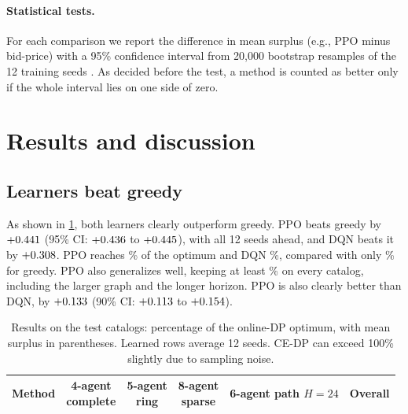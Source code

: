 \documentclass[10pt]{article}
\begin{document}
\paragraph{Statistical tests.} For each comparison we report the difference in mean surplus (e.g., PPO minus bid-price) with a 95\% confidence interval from 20{,}000 bootstrap resamples of the 12 training seeds \citep{efron1993introduction}. As decided before the test, a method is counted as better only if the whole interval lies on one side of zero.

\section{Results and discussion}\label{sec:results}

\subsection{Learners beat greedy}\label{sec:locked}

As shown in \cref{tab:main}, both learners clearly outperform greedy. PPO beats greedy by $+0.441$ (95\% CI: $+0.436$ to $+0.445$), with all 12 seeds ahead, and DQN beats it by $+0.308$. PPO reaches \cfFracPpo\% of the optimum and DQN \cfFracDqn\%, compared with only \cfFracGreedy\% for greedy. PPO also generalizes well, keeping at least \cfFracMinPpo\% on every catalog, including the larger graph and the longer horizon. PPO is also clearly better than DQN, by $+0.133$ (90\% CI: $+0.113$ to $+0.154$).

\begin{table}[t]
\centering
\caption{Results on the test catalogs: percentage of the online-DP optimum, with mean surplus in parentheses. Learned rows average 12 seeds. CE-DP can exceed 100\% slightly due to sampling noise.}
\label{tab:main}
\small
\setlength{\tabcolsep}{4pt}
\begin{tabular}{@{}lccccc@{}}
\toprule
Method & \shortstack{4-agent\\complete} & \shortstack{5-agent\\ring} & \shortstack{8-agent\\sparse} & \shortstack{6-agent path\\$H{=}24$} & Overall \\
\midrule

\end{tabular}
\end{table}
\end{document}
